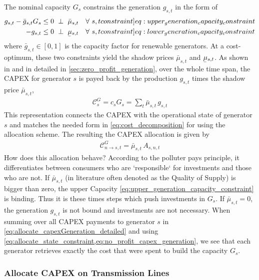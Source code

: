 \documentclass[11pt,twocolumn]{article}
\newcommand{\ubar}[1]{\underaccent{\bar}{#1}}
\newcommand{\resultsin}[1]{\hspace{6pt} \bot  \hspace{6pt} #1}
\newcommand{\Forall}[1]{\hspace{10pt} \forall \,\, #1 }
\newcommand{\generation}{g_{s,t}}
\newcommand{\generationpotential}{\bar{g}_{s,t}}
\newcommand{\capacitygeneration}{G_{s}}
\newcommand{\capitalpricegeneration}{c_{s}}
\newcommand{\mulowergeneration}{\ubar{\mu}_{s,t}}
\newcommand{\muuppergeneration}{\bar{\mu}_{s,t}}
\newcommand{\allocategeneration}[1][s, n]{A_{#1,t}}
\newcommand{\allocatecapexgeneration}[1][n \rightarrow s]{\mathcal{C}^{G}_{#1,t}}
\newcommand{\capexgeneration}{\mathcal{C}^G}
\begin{document}
The nominal capacity $\capacitygeneration$ constrains the generation $\generation$ in the form of 
\begin{align}
\generation - \generationpotential \capacitygeneration  &\le 0 \resultsin{\muuppergeneration} \Forall{s,t} 
\label[constraint]{eq:upper_generation_capacity_constraint}\\ 
- \generation &\le 0 \resultsin{\mulowergeneration} \Forall{s,t} 
\label[constraint]{eq:lower_generation_capacity_constraint}
\end{align}
where $\generationpotential \in \left[ 0,1\right]$ is the capacity factor for renewable generators. At a cost-optimum, these two constraints yield the shadow prices $\muuppergeneration$ and $\mulowergeneration$.  As shown in \cite{brown_decreasing_2020} and in detailed in \cref{sec:zero_profit_generation}, over the whole time span, the CAPEX for generator $s$ is payed back by the production $\generation$ times the shadow price $\muuppergeneration$, 
\begin{align}
 \capexgeneration_s = \capitalpricegeneration \capacitygeneration = \sum_t \muuppergeneration \,  \generation 
 \label{eq:no_profit_capex_generation}
\end{align}
This representation connects the CAPEX with the operational state of generator $s$ and matches the needed form in \cref{eq:cost_decomposition} for using the allocation scheme. The resulting the CAPEX allocation is given by
\begin{align}
 \allocatecapexgeneration = \muuppergeneration \, \allocategeneration
 \label{eq:allocate_capexGeneration_detailed}
\end{align}
How does this allocation behave? According to the polluter pays principle, it differentiates between consumers who are `responsible` for investments and those who are not. If $\muuppergeneration$ (in literature often denoted as the Quality of Supply) is bigger than zero, the upper Capacity \cref{eq:upper_generation_capacity_constraint} is binding. Thus it is these times steps which push investments in $\capacitygeneration$. If $\muuppergeneration = 0$, the generation $\generation$ is not bound and investments are not necessary. 
When summing over all CAPEX payments to generator $s$ in \cref{eq:allocate_capexGeneration_detailed} and using \cref{eq:allocate_state_constraint,eq:no_profit_capex_generation}, we see that each generator retrieves exactly the cost that were spent to build the capacity $\capacitygeneration$.
 

\subsubsection*{Allocate CAPEX on Transmission Lines}
\end{document}
